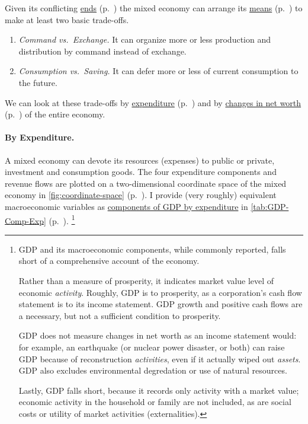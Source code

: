 
Given its conflicting \hyperref[sec:ends]{ends} (p.~\pageref{sec:ends}) the mixed economy can arrange its \hyperref[sec:means]{means} (p.~\pageref{sec:means}) to make at least two basic trade-offs.
\begin{enumerate}
	\item \emph{Command vs.\ Exchange.} It can organize more or less production and distribution by command instead of exchange.
	\item \emph{Consumption vs.\ Saving.} It can defer more or less of current consumption to the future.
\end{enumerate}

We can look at these trade-offs by \hyperref[sec:by-expenditure]{expenditure} (p.~\pageref{sec:by-expenditure}) and by \hyperref[sec:delta-net-worth]{changes in net worth} (p.~\pageref{sec:delta-net-worth}) of the entire economy.

\paragraph[By Expenditure]{By Expenditure.}  \label{sec:by-expenditure}
A mixed economy can devote its resources (expenses) to public or private, investment and consumption goods.
The four expenditure components and revenue flows are plotted on a two-dimensional coordinate space of the mixed economy in \autoref{fig:coordinate-space} (p.~\pageref{fig:coordinate-space}).
I provide (very roughly) equivalent macroeconomic variables as \hyperref[tab:GDP-Comp-Exp]{components of GDP by expenditure} in \autoref{tab:GDP-Comp-Exp} (p.~\pageref{tab:GDP-Comp-Exp}).
\footnote{
	\gls{GDP} and its macroeconomic components, while commonly reported, falls short of a comprehensive account of the economy.

	Rather than a measure of prosperity, it indicates market value level of economic \emph{activity}.
	Roughly, \gls{GDP} is to prosperity, as a corporation's cash flow statement is to its income statement.
	\gls{GDP} growth and positive cash flows are a necessary, but not a sufficient condition to prosperity.

	\gls{GDP} does not measure changes in net worth as an income statement would:
	for example, an earthquake (or nuclear power disaster, or both) can raise \gls{GDP} because of reconstruction \emph{activities}, even if it actually wiped out \emph{assets}.
	\gls{GDP} also excludes environmental degredation or use of natural resources.

	Lastly, \gls{GDP} falls short, because it records only activity with a market value;
	economic activity in the household or family are not included, as are social costs or utility of market activities (externalities).
}

